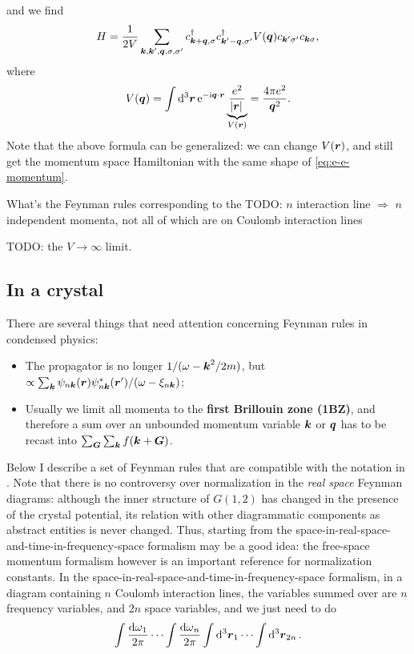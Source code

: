 \documentclass[hyperref, a4paper]{report}
\newcommand*{\ii}{\mathrm{i}}
\newcommand*{\ee}{\mathrm{e}}
\newcommand*{\concept}[1]{{\textbf{#1}}}
\begin{document}
and we find 
\begin{equation}
    H = \frac{1}{2V} \sum_{\vb*{k}, \vb*{k}', \vb*{q}, \sigma, \sigma'}
    c^\dagger_{\vb*{k} + \vb*{q}, \sigma} c^\dagger_{\vb*{k}' - \vb*{q}, \sigma'}
    V(\vb*{q}) c_{\vb*{k}' \sigma'} c_{\vb*{k} \sigma}, 
    \label{eq:e-e-momentum}
\end{equation}
where 
\begin{equation}
    V(\vb*{q}) = \int \dd[3]{\vb*{r}} \ee^{- \ii \vb*{q} \cdot \vb*{r}} \underbrace{\frac{e^2}{\abs*{\vb*{r}}}}_{V(\vb*{r})} = \frac{4\pi e^2}{\vb*{q}^2}.
\end{equation}
Note that the above formula can be generalized: 
we can change $V(\vb*{r})$, 
and still get the momentum space Hamiltonian with the same shape of \eqref{eq:e-e-momentum}.

What's the Feynman rules corresponding to the 
TODO: $n$ interaction line $\Rightarrow$ $n$ independent momenta,
not all of which are on Coulomb interaction lines

TODO: the $V \to \infty$ limit.

\subsection{In a crystal}\label{sec:crystal}

There are several things that need attention concerning Feynman rules in condensed physics:
\begin{itemize}
    \item The propagator is no longer $1 / (\omega - \vb*{k}^2 / 2m)$, but 
    $\propto \sum_{\vb*{k}} \psi_{n \vb*{k}}(\vb*{r}) \psi^*_{n \vb*{k}} (\vb*{r}') / (\omega - \xi_{n \vb*{k}})$;
    \item Usually we limit all momenta to the \concept{first Brillouin zone (1BZ)}, 
    and therefore a sum over an unbounded momentum variable $\vb*{k}$ or $\vb*{q}$
    has to be recast into $\sum_{\vb*{G}} \sum_{\vb*{k}} f(\vb*{k} + \vb*{G})$.
\end{itemize}

Below I describe a set of Feynman rules that are compatible with the notation in \cite{hybertsen1986electron}.
Note that there is no controversy over 
normalization in the \emph{real space} Feynman diagrams:
although the inner structure of $G(1, 2)$ has changed in the presence of the crystal potential, 
its relation with other diagrammatic components as abstract entities 
is never changed.
Thus, starting from the space-in-real-space-and-time-in-frequency-space formalism may be a good idea:
the free-space momentum formalism 
however is an important reference for normalization constants.
In the space-in-real-space-and-time-in-frequency-space formalism,
in a diagram containing $n$ Coulomb interaction lines,
the variables summed over are $n$ frequency variables,
and $2n$ space variables,
and we just need to do 
\begin{equation}
    \int \frac{\dd{\omega}_1}{2\pi} \cdots \int \frac{\dd{\omega}_n}{2\pi} 
    \int \dd[3]{\vb*{r}_1} \cdots \int \dd[3]{\vb*{r}_{2n}}.
\end{equation}
\end{document}
